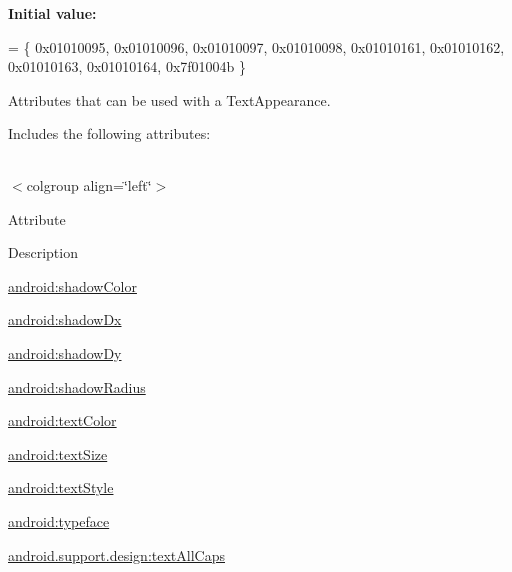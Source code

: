 {\bfseries Initial value\+:}
\begin{DoxyCode}
= \{
            0x01010095, 0x01010096, 0x01010097, 0x01010098,
            0x01010161, 0x01010162, 0x01010163, 0x01010164,
            0x7f01004b
        \}
\end{DoxyCode}
Attributes that can be used with a Text\+Appearance. 

Includes the following attributes\+:

\tabulinesep=1mm
\begin{longtabu} spread 0pt [c]{*{0}{|X[-1]}|}
\hline
\end{longtabu}
$<$colgroup align=\char`\"{}left\char`\"{}$>$ 

Attribute

Description 

{\ttfamily \hyperlink{classandroid_1_1support_1_1design_1_1R_1_1styleable_a893f65ffb93f1abcb29dbaeac41edea4}{android\+:shadow\+Color}}

{\ttfamily \hyperlink{classandroid_1_1support_1_1design_1_1R_1_1styleable_a30a8e4e2699c781ee99129168187e77f}{android\+:shadow\+Dx}}

{\ttfamily \hyperlink{classandroid_1_1support_1_1design_1_1R_1_1styleable_aa0966b9f92f1a6c95b273b28b68eb9b4}{android\+:shadow\+Dy}}

{\ttfamily \hyperlink{classandroid_1_1support_1_1design_1_1R_1_1styleable_aadd2af965093afd5bbd56af5349e534d}{android\+:shadow\+Radius}}

{\ttfamily \hyperlink{classandroid_1_1support_1_1design_1_1R_1_1styleable_a94894b984b558f8b9a8b6fab3346043b}{android\+:text\+Color}}

{\ttfamily \hyperlink{classandroid_1_1support_1_1design_1_1R_1_1styleable_a360f5c584c9ab85d870c4a194a6822f1}{android\+:text\+Size}}

{\ttfamily \hyperlink{classandroid_1_1support_1_1design_1_1R_1_1styleable_a0a2a5b4e6900c18a9611ee403142f371}{android\+:text\+Style}}

{\ttfamily \hyperlink{classandroid_1_1support_1_1design_1_1R_1_1styleable_ab0453bf31379b054bdb8f41d7d5ec54b}{android\+:typeface}}

{\ttfamily \hyperlink{classandroid_1_1support_1_1design_1_1R_1_1styleable_ae246508ce6dc881e48a667cda664ad04}{android.\+support.\+design\+:text\+All\+Caps}}

